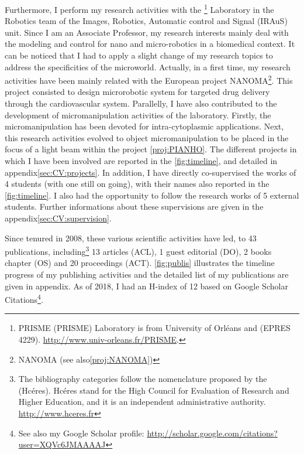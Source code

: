 Furthermore, I perform my research activities with the \PRISMEshort\footnote{{\acrlong{PRISME}} (PRISME) Laboratory is from University of Orléans  and \INSAshort \CVL (EPRES 4229). \url{http://www.univ-orleans.fr/PRISME}.}  
Laboratory in the Robotics team of the Images, Robotics, Automatic control and Signal (IRAuS) unit.
Since I am an Associate Professor, my research interests mainly deal with the modeling and control for nano and micro-robotics in a biomedical context.
It can be noticed that I had to apply a slight change of my research topics  to address the specificities of the microworld.
Actually, in a first time, my research activities have been mainly related with the European project \acrshort{NANOMA}\footnote{\acrlong{NANOMA} (see also\;\protect\ref{proj:NANOMA})}.
This project consisted to design microrobotic system for targeted drug delivery through the cardiovascular system.
Parallelly, I have also contributed to the development of micromanipulation activities of the laboratory.
Firstly, the micromanipulation has been devoted for intra-cytoplasmic applications\cite{2011_icra_kim,2012_tase_kim}.
Next, this research activities evolved to object micromanipulation to be placed in the focus of a light beam within the \ANRshort project \PIANHOfoot\ref{proj:PIANHO}.
The different projects in which I have been involved are reported in the \autoref{fig:timeline}, and detailed in appendix\;\ref{sec:CV:projects}.
In addition, I have directly co-supervised the works of 4 \PhD students (with one still on going), with their names also reported in the \autoref{fig:timeline}.
I also  had the opportunity to follow the research works of 5 external \PhD students. 
Further informations about these supervisions are given in the appendix\;\ref{sec:CV:supervision}.

Since tenured in 2008, these various scientific activities have led,  to 43 publications, including\footnote{The bibliography categories follow the nomenclature proposed by the  (Hcéres)\cite{2018_hceres}.
Hcéres stand for the High Council for Evaluation of Research and Higher Education, and it is an independent administrative authority.  \url{http://www.hceres.fr}} 13 articles (ACL), 1 guest editorial (DO), 2 books chapter (OS) and 20 proceedings (ACT).
\autoref{fig:publis} illustrates the timeline progress of my publishing activities and the detailed list of my publications are given in appendix\;\RefAnnexeRef. 
As of 2018, I had an H-index of 12 based on Google Scholar Citations\footnote{See also my Google Scholar profile: \url{http://scholar.google.com/citations?user=XQVc6JMAAAAJ}}. 

